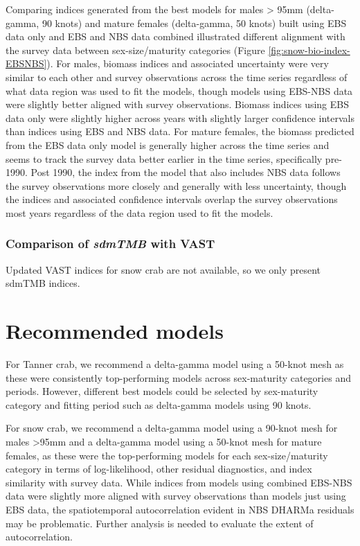 \documentclass[
]{article}
\begin{document}
Comparing indices generated from the best models for males \textgreater{} 95mm (delta-gamma, 90 knots) and mature females (delta-gamma, 50 knots) built using EBS data only and EBS and NBS data combined illustrated different alignment with the survey data between sex-size/maturity categories (Figure \ref{fig:snow-bio-index-EBSNBS}). For males, biomass indices and associated uncertainty were very similar to each other and survey observations across the time series regardless of what data region was used to fit the models, though models using EBS-NBS data were slightly better aligned with survey observations. Biomass indices using EBS data only were slightly higher across years with slightly larger confidence intervals than indices using EBS and NBS data. For mature females, the biomass predicted from the EBS data only model is generally higher across the time series and seems to track the survey data better earlier in the time series, specifically pre-1990. Post 1990, the index from the model that also includes NBS data follows the survey observations more closely and generally with less uncertainty, though the indices and associated confidence intervals overlap the survey observations most years regardless of the data region used to fit the models.

\subsubsection*{\texorpdfstring{Comparison of \emph{sdmTMB} with VAST}{Comparison of sdmTMB with VAST}}\label{comparison-of-sdmtmb-with-vast-1}

Updated VAST indices for snow crab are not available, so we only present sdmTMB indices.

\section*{Recommended models}\label{recommended-models}

For Tanner crab, we recommend a delta-gamma model using a 50-knot mesh as these were consistently top-performing models across sex-maturity categories and periods. However, different best models could be selected by sex-maturity category and fitting period such as delta-gamma models using 90 knots.

For snow crab, we recommend a delta-gamma model using a 90-knot mesh for males \textgreater95mm and a delta-gamma model using a 50-knot mesh for mature females, as these were the top-performing models for each sex-size/maturity category in terms of log-likelihood, other residual diagnostics, and index similarity with survey data. While indices from models using combined EBS-NBS data were slightly more aligned with survey observations than models just using EBS data, the spatiotemporal autocorrelation evident in NBS DHARMa residuals may be problematic. Further analysis is needed to evaluate the extent of autocorrelation.
\end{document}
